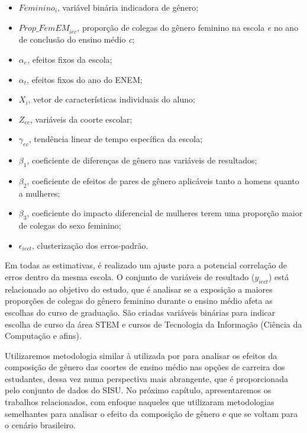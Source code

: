 \begin{itemize}
  \item $\textit{Feminino}_i$, variável binária indicadora de gênero;
  \item $\textit{Prop\_FemEM}_{iec}$, proporção de colegas do gênero feminino na escola \textit{e} no ano de conclusão do ensino médio \textit{c};
  \item $\alpha_e$, efeitos fixos da escola;
  \item $\alpha_t$, efeitos fixos do ano do ENEM;
  \item $X_i$, vetor de características individuais do aluno;
  \item $Z_{ec}$, variáveis da coorte escolar;
  \item $\gamma_{ec}$, tendência linear de tempo específica da escola;
  \item $\beta_1$, coeficiente de diferenças de gênero nas variáveis de resultados;
  \item $\beta_2$, coeficiente de efeitos de pares de gênero aplicáveis tanto a homens quanto a mulheres;
  \item $\beta_3$, coeficiente do impacto diferencial de mulheres terem uma proporção maior de colegas do sexo feminino;
  \item $\epsilon_{iect}$, clusterização dos erros-padrão.
\end{itemize}

Em todas as estimativas, é realizado um ajuste para a potencial correlação de erros dentro da mesma escola. O conjunto de variáveis de resultado ($y_{iect}$) está relacionado ao objetivo do estudo, que é analisar se a exposição a maiores proporções de colegas do gênero feminino durante o ensino médio afeta as escolhas do curso de graduação. São criadas variáveis binárias para indicar escolha de curso da área STEM e cursos de Tecnologia da Informação (Ciência da Computação e afins).

Utilizaremos metodologia similar à utilizada por \citet{Borges2021} para analisar os efeitos da composição de gênero das coortes de ensino médio nas opções de carreira dos estudantes, dessa vez numa perspectiva mais abrangente, que é proporcionada pelo conjunto de dados do SISU. No próximo capítulo, apresentaremos os trabalhos relacionados, com enfoque naqueles que utilizaram metodologias semelhantes para analisar o efeito da composição de gênero e que se voltam para o cenário brasileiro.